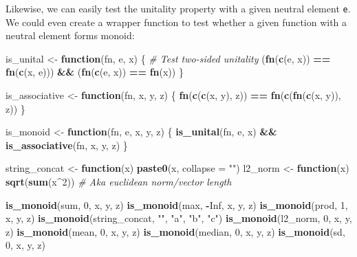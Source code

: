 \documentclass[
]{book}
\newenvironment{Shaded}{\begin{snugshade}}{\end{snugshade}}
\newcommand{\AttributeTok}[1]{\textcolor[rgb]{0.13,0.29,0.53}{#1}}
\newcommand{\CommentTok}[1]{\textcolor[rgb]{0.56,0.35,0.01}{\textit{#1}}}
\newcommand{\ConstantTok}[1]{\textcolor[rgb]{0.56,0.35,0.01}{#1}}
\newcommand{\ControlFlowTok}[1]{\textcolor[rgb]{0.13,0.29,0.53}{\textbf{#1}}}
\newcommand{\DecValTok}[1]{\textcolor[rgb]{0.00,0.00,0.81}{#1}}
\newcommand{\FunctionTok}[1]{\textcolor[rgb]{0.13,0.29,0.53}{\textbf{#1}}}
\newcommand{\NormalTok}[1]{#1}
\newcommand{\OtherTok}[1]{\textcolor[rgb]{0.56,0.35,0.01}{#1}}
\newcommand{\SpecialCharTok}[1]{\textcolor[rgb]{0.81,0.36,0.00}{\textbf{#1}}}
\newcommand{\StringTok}[1]{\textcolor[rgb]{0.31,0.60,0.02}{#1}}
\theoremstyle{definition}
\theoremstyle{definition}
\theoremstyle{definition}
\theoremstyle{definition}
\theoremstyle{remark}
\begin{document}
Likewise, we can easily test the unitality property with a given neutral element \texttt{e}. We could even create a wrapper function to test whether a given function with a neutral element forms monoid:

\begin{Shaded}
\begin{Highlighting}[]
\NormalTok{is\_unital }\OtherTok{\textless{}{-}} \ControlFlowTok{function}\NormalTok{(fn, e, x) \{}
  \CommentTok{\# Test two{-}sided unitality}
\NormalTok{  (}\FunctionTok{fn}\NormalTok{(}\FunctionTok{c}\NormalTok{(e, x)) }\SpecialCharTok{==} \FunctionTok{fn}\NormalTok{(}\FunctionTok{c}\NormalTok{(x, e))) }\SpecialCharTok{\&\&}\NormalTok{ (}\FunctionTok{fn}\NormalTok{(}\FunctionTok{c}\NormalTok{(e, x)) }\SpecialCharTok{==} \FunctionTok{fn}\NormalTok{(x))}
\NormalTok{\}}

\NormalTok{is\_associative }\OtherTok{\textless{}{-}} \ControlFlowTok{function}\NormalTok{(fn, x, y, z) \{}
  \FunctionTok{fn}\NormalTok{(}\FunctionTok{c}\NormalTok{(}\FunctionTok{c}\NormalTok{(x, y), z)) }\SpecialCharTok{==} \FunctionTok{fn}\NormalTok{(}\FunctionTok{c}\NormalTok{(}\FunctionTok{fn}\NormalTok{(}\FunctionTok{c}\NormalTok{(x, y)), z))}
\NormalTok{\}}

\NormalTok{is\_monoid }\OtherTok{\textless{}{-}} \ControlFlowTok{function}\NormalTok{(fn, e, x, y, z) \{}
  \FunctionTok{is\_unital}\NormalTok{(fn, e, x) }\SpecialCharTok{\&\&} \FunctionTok{is\_associative}\NormalTok{(fn, x, y, z)}
\NormalTok{\}}

\NormalTok{string\_concat }\OtherTok{\textless{}{-}} \ControlFlowTok{function}\NormalTok{(x) }\FunctionTok{paste0}\NormalTok{(x, }\AttributeTok{collapse =} \StringTok{""}\NormalTok{)}
\NormalTok{l2\_norm }\OtherTok{\textless{}{-}} \ControlFlowTok{function}\NormalTok{(x) }\FunctionTok{sqrt}\NormalTok{(}\FunctionTok{sum}\NormalTok{(x}\SpecialCharTok{\^{}}\DecValTok{2}\NormalTok{)) }\CommentTok{\# Aka euclidean norm/vector length}

\FunctionTok{is\_monoid}\NormalTok{(sum, }\DecValTok{0}\NormalTok{, x, y, z)}
\FunctionTok{is\_monoid}\NormalTok{(max, }\SpecialCharTok{{-}}\ConstantTok{Inf}\NormalTok{, x, y, z)}
\FunctionTok{is\_monoid}\NormalTok{(prod, }\DecValTok{1}\NormalTok{, x, y, z)}
\FunctionTok{is\_monoid}\NormalTok{(string\_concat, }\StringTok{""}\NormalTok{, }\StringTok{"a"}\NormalTok{, }\StringTok{"b"}\NormalTok{, }\StringTok{"c"}\NormalTok{)}
\FunctionTok{is\_monoid}\NormalTok{(l2\_norm, }\DecValTok{0}\NormalTok{, x, y, z)}
\FunctionTok{is\_monoid}\NormalTok{(mean, }\DecValTok{0}\NormalTok{, x, y, z)}
\FunctionTok{is\_monoid}\NormalTok{(median, }\DecValTok{0}\NormalTok{, x, y, z)}
\FunctionTok{is\_monoid}\NormalTok{(sd, }\DecValTok{0}\NormalTok{, x, y, z)}
\end{Highlighting}
\end{Shaded}
\end{document}
